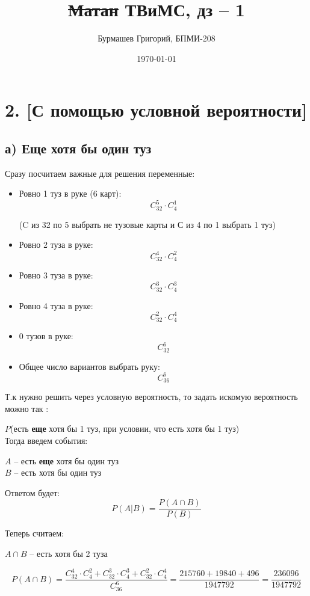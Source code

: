 \documentclass[a4paper,12pt]{article}
\author{Бурмашев Григорий, БПМИ-208}
\title{\sout{Матан} ТВиМС, дз -- 1}
\date{\today}
\begin{document}
\maketitle
\section*{2. [С помощью условной вероятности]} 
\subsection*{а) Еще хотя бы один туз}

Сразу посчитаем важные для решения переменные:
\begin{itemize}
\item Ровно 1 туз в руке (6 карт):
\[
C^5_{32} \cdot C^1_4 
\]
\begin{center}
(C из 32 по 5 выбрать не тузовые карты и С из 4 по 1 выбрать 1 туз)
\end{center}

\item Ровно 2 туза в руке:
\[
C^4_{32} \cdot 	C^2_4
\]

\item Ровно 3 туза в руке:
\[
C^3_{32} \cdot C^3_4
\]

\item Ровно 4 туза в руке:
\[
C^2_{32} \cdot C^4_4
\]

\item 0 тузов в руке:
\[
C^6_{32}
\]

\item Общее число вариантов выбрать руку:
\[
C^6_{36}
\]
\end{itemize}
\clearpage
Т.к  нужно решить через условную вероятность, то задать искомую вероятность можно так : 

$P$(есть \textbf{еще} хотя бы 1 туз, при условии, что есть хотя бы 1 туз)
\\

Тогда введем события:
\begin{center}
$A$ -- есть \textbf{еще} хотя бы один туз
\\
$B$ -- есть хотя бы один туз
\end{center}

Ответом будет:
\[
P(A |B) = \frac{P(A \cap B)}{P(B)}
\]

Теперь считаем:
\begin{center}
$A \cap B$ -- есть хотя бы 2 туза 
\end{center}
\[
P(A \cap B) = \frac{C^4_{32} \cdot 	C^2_4 +C^3_{32} \cdot C^3_4 +  C^2_{32} \cdot C^4_4}{C^6_{36}}  = \frac{215760 + 19840 + 496}{1947792} = \frac{236096}{1947792}
\]
\end{document}
